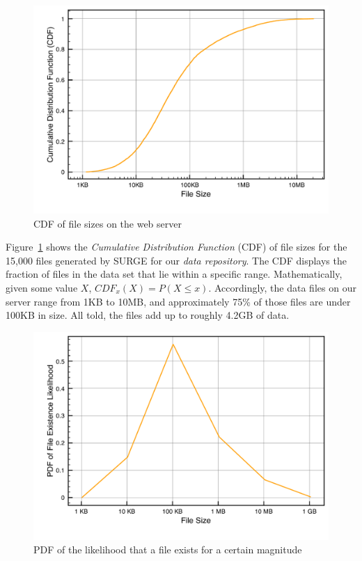 \begin{figure}
\begin{center}
\includegraphics[scale=0.5]{figures/hierarchy-data-cdf.pdf}
\end{center}
\caption{CDF of file sizes on the web server}
\label{fig:file-cdf}
\end{figure}

Figure~\ref{fig:file-cdf} shows the \emph{Cumulative Distribution Function}
(CDF) of file sizes for the 15,000 files generated by SURGE for our \emph{data
repository}. The CDF displays the fraction of files in the data set that lie
within a specific range. Mathematically, given some value $X$, $CDF_x(X) = P(X
\leq x)$. Accordingly, the data files on our server range from 1KB to 10MB, and
approximately 75\% of those files are under 100KB in size. All told, the files
add up to roughly 4.2GB of data.

\begin{figure}
\begin{center}
\includegraphics[scale=0.5]{figures/hierarchy-data-pdf-existence.pdf}
\end{center}
\caption{PDF of the likelihood that a file exists for a certain magnitude}
\label{fig:file-pdf-exists}
\end{figure}



